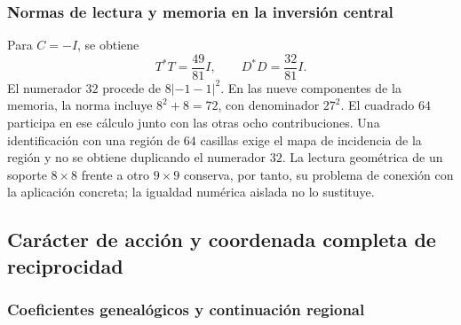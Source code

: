 \subsubsection{Normas de lectura y memoria en la inversión central}
\label{md:restop:treinta-y-dos}

Para $C=-I$, se obtiene
\begin{equation}
 T^*T=\frac{49}{81}I,\qquad
 D^*D=\frac{32}{81}I.
 \label{md:restop:normas}
\end{equation}
El numerador $32$ procede de $8|{-1}-1|^2$.
En las nueve componentes de la memoria, la norma incluye
$8^2+8=72$, con denominador $27^2$. El cuadrado $64$ participa en
ese cálculo junto con las otras ocho contribuciones.
Una identificación con una región de $64$ casillas exige el mapa de
incidencia de la región y no se obtiene duplicando el numerador $32$.
La lectura geométrica de un soporte $8\times8$ frente a otro
$9\times9$ conserva, por tanto, su problema de conexión con la
aplicación concreta; la igualdad numérica aislada no lo sustituye.

\clearpage
\subsection{Carácter de acción y coordenada completa de reciprocidad}
\label{md:restop:h5}

\subsubsection{Coeficientes genealógicos y continuación regional}
\label{md:restop:coeficientes}

